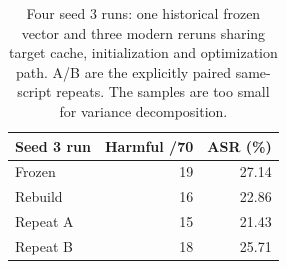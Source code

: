 \begin{table}[t]
\centering
\small
\setlength{\tabcolsep}{3pt}
\begin{tabular}{lrr}
\toprule
Seed 3 run & Harmful /70 & ASR (\%) \\
\midrule
Frozen & 19 & 27.14 \\
Rebuild & 16 & 22.86 \\
Repeat A & 15 & 21.43 \\
Repeat B & 18 & 25.71 \\
\bottomrule
\end{tabular}
\caption{Four seed 3 runs: one historical frozen vector and three modern reruns sharing target cache, initialization and optimization path. A/B are the explicitly paired same-script repeats. The samples are too small for variance decomposition.}
\label{tab:repeats}
\end{table}
